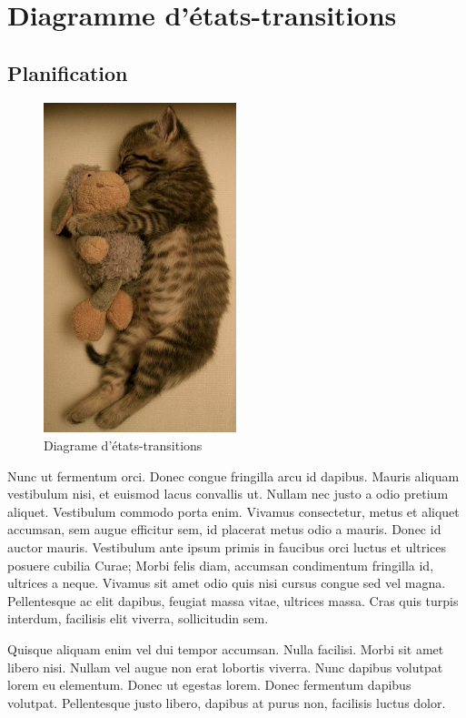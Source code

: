 \section{Diagramme d'états-transitions}

	\subsection{Planification}
		\begin{figure}
			\begin{center}
				\includegraphics[width=0.5\textwidth]{figure/planif.jpg}
			\end{center}
			\caption{Diagrame d'états-transitions}
			\label{fig:planif}
		\end{figure}

		Nunc ut fermentum orci. Donec congue fringilla arcu id dapibus. Mauris aliquam vestibulum nisi, et euismod lacus convallis ut. Nullam nec justo a odio pretium aliquet. Vestibulum commodo porta enim. Vivamus consectetur, metus et aliquet accumsan, sem augue efficitur sem, id placerat metus odio a mauris. Donec id auctor mauris. Vestibulum ante ipsum primis in faucibus orci luctus et ultrices posuere cubilia Curae; Morbi felis diam, accumsan condimentum fringilla id, ultrices a neque. Vivamus sit amet odio quis nisi cursus congue sed vel magna. Pellentesque ac elit dapibus, feugiat massa vitae, ultrices massa. Cras quis turpis interdum, facilisis elit viverra, sollicitudin sem.

		Quisque aliquam enim vel dui tempor accumsan. Nulla facilisi. Morbi sit amet libero nisi. Nullam vel augue non erat lobortis viverra. Nunc dapibus volutpat lorem eu elementum. Donec ut egestas lorem. Donec fermentum dapibus volutpat. Pellentesque justo libero, dapibus at purus non, facilisis luctus dolor. 
